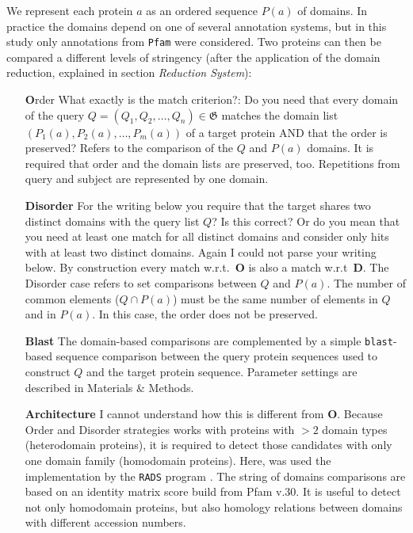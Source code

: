 \documentclass[11pt]{article}
\newcommand{\TODO}[1]{\begingroup\color{red}#1\endgroup}
\newcommand{\CAVH}[1]{\begingroup\color{green}#1\endgroup}
\begin{document}
We represent each protein $a$ as an ordered sequence $P(a)$ of domains. In
practice the domains depend on one of several annotation systems, 
\CAVH{but in this study only annotations from \texttt{Pfam} were considered}. Two 
proteins can then be compared a different levels of stringency (\CAVH{after the 
application of the domain reduction, explained in section \textit{Reduction 
System}}):
\begin{itemize}
\item[\textbf{O}rder] \TODO{What exactly is the match criterion?: Do you need
    that every domain of the query
    $Q=(Q_1,Q_2,\dots,Q_n)\in \boldsymbol{\mathfrak{G}}$ matches the
    domain list $ (P_1(a),P_2(a),\dots,P_m(a))$ of a target protein AND that
    the order is preserved? }
    \CAVH{Refers to the comparison of the $Q$ and $P(a)$ domains. It is 
required that order and the domain lists are preserved, too. Repetitions from 
query and subject are represented by one domain.}
\item[\textbf{Disorder}] \TODO{For the writing below you require that the target
    shares two distinct domains with the query list $Q$? Is this correct?
    Or do you mean that you need at least one match for all distinct
    domains and consider only hits with at least two distinct
    domains. Again I could not parse your writing below.} By construction
  every match w.r.t.\ \textbf{O} is also a match w.r.t\ \textbf{D}.
  \CAVH{The Disorder case refers to set comparisons between $Q$ and $P(a)$. 
The number of common elements ($Q \cap P(a)$) must be the same number of 
elements in $Q$ and in $P(a)$. In this case, the order does not be 
preserved.} 
\item[\textbf{Blast}] The domain-based comparisons are complemented by a simple
  \texttt{blast}-based sequence comparison between the query protein
  sequences used to construct $Q$ and the target protein
  sequence. Parameter settings are described in Materials \& Methods.
\item[\textbf{Architecture}] \TODO{I cannot understand how this is different 
from \textbf{O}.} \CAVH{Because Order and Disorder strategies works with 
proteins with $> 2$ domain types (heterodomain proteins), it is required to 
detect those candidates with only one domain family (homodomain proteins). 
Here, was used the implementation by the \texttt{RADS} program  
\cite{Terrapon:2014}. The string of domains comparisons are based on 
an identity matrix score build from Pfam v.30. It is useful to detect not only 
homodomain proteins, but also homology relations between domains with different 
accession numbers.}  
\end{itemize}
\end{document}
